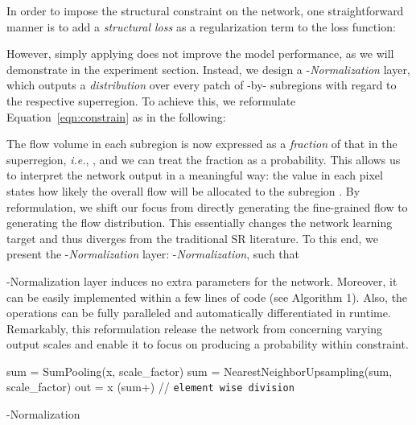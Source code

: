 In order to impose the structural constraint on the network, one straightforward manner is to add a \emph{structural loss}  as a regularization term to the loss function:
\iffalse

\fi



However, simply applying  does not improve the model performance, as we will demonstrate in the experiment section. Instead, we design a -\textit{Normalization} layer, which outputs a \textit{distribution} over every patch of -by- subregions with regard to the respective superregion. To achieve this, we reformulate Equation~\ref{eqn:constrain} as in the following:
\iffalse

\fi

The flow volume in each subregion is now expressed as a \textit{fraction} of that in the superregion, \emph{i.e.}, , and we can treat the fraction as a probability. This allows us to interpret the network output in a meaningful way: the value in each pixel states how likely the overall flow will be allocated to the subregion . By reformulation, we shift our focus from directly generating the fine-grained flow to generating the flow distribution. This essentially changes the network learning target and thus diverges from the traditional SR literature. To this end, we present the -\textit{Normalization} layer: -\textit{Normalization}, such that
\iffalse
which takes a feature map as input and outputs a flow distribution map  


\fi



-Normalization layer induces no extra parameters for the network. Moreover, it can be easily implemented within a few lines of code (see Algorithm 1). Also, the operations can be fully paralleled and automatically differentiated in runtime. Remarkably, this reformulation release the network from concerning varying output scales and enable it to focus on producing a probability within  constraint.
\begin{algorithm}[!t]
\SetAlgoLined
  \vspace{-0.5mm}
  \vspace{-0.5mm}
  \vspace{-0.5mm}
 \vspace{2mm}
 sum = SumPooling(x, scale\_factor)\;
 sum = NearestNeighborUpsampling(sum, scale\_factor)\;
 out \hspace{1mm}= x  (sum+) // \texttt{element wise division} 
 \caption{-Normalization}
 \label{alg:n2}
\end{algorithm}
 

